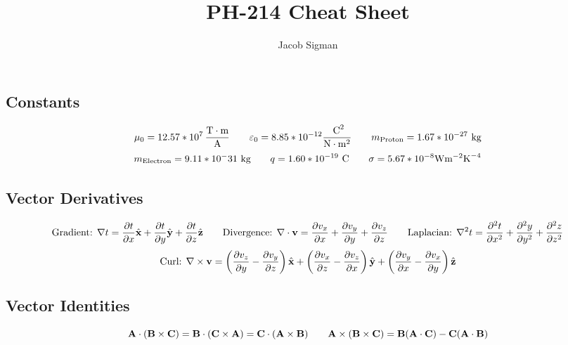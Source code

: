 \documentclass{article}
\title{PH-214 Cheat Sheet}
\author{Jacob Sigman}
\date{}
\begin{document}
\maketitle

\subsection*{Constants}
\[\mu_0=12.57*10^7\,\frac{\textnormal{T}\cdot\textnormal{m}}{\textnormal{A}}\hspace{7 mm}\varepsilon_0=8.85*10^{-12}\frac{\textnormal{ C}^2}{\textnormal{N}\cdot\textnormal{m}^2}\hspace{7 mm}m_{\textnormal{Proton}}=1.67*10^{-27}\textnormal{ kg}\]
\[m_{\textnormal{Electron}}=9.11*10^-31\textnormal{ kg}\hspace{7 mm}q=1.60*10^{-19} \textnormal{ C}\hspace{7 mm}\sigma=5.67*10^{-8}\textnormal{W}\textnormal{m}^{-2}\textnormal{K}^{-4}\]
\subsection*{Vector Derivatives}
\[\textnormal{Gradient: }\nabla t = \frac{\partial t}{\partial x}\hat{\textbf{x}}+\frac{\partial t}{\partial y}\hat{\textbf{y}}+\frac{\partial t}{\partial z}\hat{\textbf{z}}\hspace{7 mm}\textnormal{Divergence: }\nabla\cdot \textbf{v}=\frac{\partial v_x}{\partial x}+\frac{\partial v_y}{\partial y}+\frac{\partial v_z}{\partial z}\hspace{7 mm}\textnormal{Laplacian: }\nabla^2t=\frac{\partial^2t}{\partial x^2}+\frac{\partial^2y}{\partial y^2}+\frac{\partial^2z}{\partial z^2}\]
\[\textnormal{Curl: }\nabla\times \textbf{v} = \left(\frac{\partial v_z}{\partial y}-\frac{\partial v_y}{\partial z}\right)\hat{\textbf{x}}+\left(\frac{\partial v_x}{\partial z}-\frac{\partial v_z}{\partial x}\right)\hat{\textbf{y}}+\left(\frac{\partial v_y}{\partial x}-\frac{\partial v_x}{\partial y}\right)\hat{\textbf{z}}\]
\subsection*{Vector Identities}
\[\textbf{A}\cdot(\textbf{B}\times\textbf{C})=\textbf{B}\cdot(\textbf{C}\times\textbf{A})=\textbf{C}\cdot(\textbf{A}\times\textbf{B})\hspace{7 mm}\textbf{A}\times(\textbf{B}\times\textbf{C})=\textbf{B}(\textbf{A}\cdot\textbf{C})-\textbf{C}(\textbf{A}\cdot\textbf{B})\]
\end{document}
